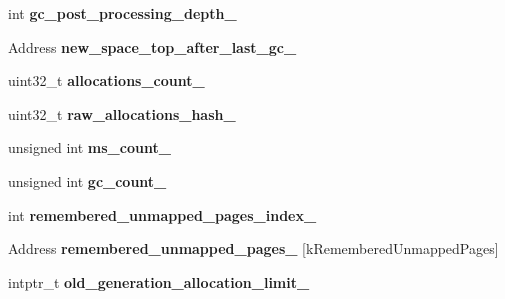 \begin{DoxyCompactItemize}
\item 
int {\bfseries gc\+\_\+post\+\_\+processing\+\_\+depth\+\_\+}\hypertarget{classv8_1_1internal_1_1_heap_a93668c2c0b8ab442de9bf48eb110a7b1}{}\label{classv8_1_1internal_1_1_heap_a93668c2c0b8ab442de9bf48eb110a7b1}

\item 
Address {\bfseries new\+\_\+space\+\_\+top\+\_\+after\+\_\+last\+\_\+gc\+\_\+}\hypertarget{classv8_1_1internal_1_1_heap_ab34c3141573ba5fc871266ee6fed8e41}{}\label{classv8_1_1internal_1_1_heap_ab34c3141573ba5fc871266ee6fed8e41}

\item 
uint32\+\_\+t {\bfseries allocations\+\_\+count\+\_\+}\hypertarget{classv8_1_1internal_1_1_heap_a63565087820c0d93af5f17c545c83813}{}\label{classv8_1_1internal_1_1_heap_a63565087820c0d93af5f17c545c83813}

\item 
uint32\+\_\+t {\bfseries raw\+\_\+allocations\+\_\+hash\+\_\+}\hypertarget{classv8_1_1internal_1_1_heap_a2d84adb0c6f43ccb05bbb57b194b1387}{}\label{classv8_1_1internal_1_1_heap_a2d84adb0c6f43ccb05bbb57b194b1387}

\item 
unsigned int {\bfseries ms\+\_\+count\+\_\+}\hypertarget{classv8_1_1internal_1_1_heap_a5ba4b109a3e0d670abd60d1f9da6dfdb}{}\label{classv8_1_1internal_1_1_heap_a5ba4b109a3e0d670abd60d1f9da6dfdb}

\item 
unsigned int {\bfseries gc\+\_\+count\+\_\+}\hypertarget{classv8_1_1internal_1_1_heap_ac8ce781658aa866e6826bc8a3cbd01d1}{}\label{classv8_1_1internal_1_1_heap_ac8ce781658aa866e6826bc8a3cbd01d1}

\item 
int {\bfseries remembered\+\_\+unmapped\+\_\+pages\+\_\+index\+\_\+}\hypertarget{classv8_1_1internal_1_1_heap_a9ff6869b9142597df43b793e46991318}{}\label{classv8_1_1internal_1_1_heap_a9ff6869b9142597df43b793e46991318}

\item 
Address {\bfseries remembered\+\_\+unmapped\+\_\+pages\+\_\+} \mbox{[}k\+Remembered\+Unmapped\+Pages\mbox{]}\hypertarget{classv8_1_1internal_1_1_heap_a0695cca4a311afa257e885d5b97a23d5}{}\label{classv8_1_1internal_1_1_heap_a0695cca4a311afa257e885d5b97a23d5}

\item 
intptr\+\_\+t {\bfseries old\+\_\+generation\+\_\+allocation\+\_\+limit\+\_\+}\hypertarget{classv8_1_1internal_1_1_heap_a5b8b2ded91db95d8274cec9119db82db}{}\label{classv8_1_1internal_1_1_heap_a5b8b2ded91db95d8274cec9119db82db}


\end{DoxyCompactItemize}
